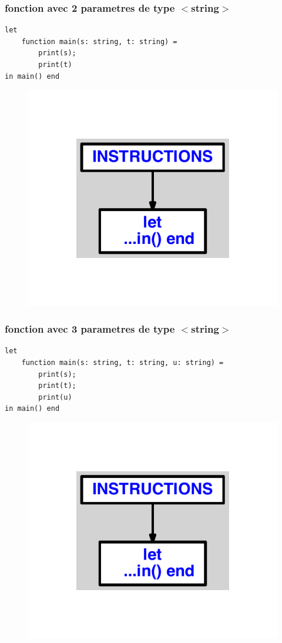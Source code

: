 \documentclass{article}
\begin{document}
\subsubsection{fonction avec 2 parametres de type $ < $string$ > $}
\begin{lstlisting}
let
	function main(s: string, t: string) =
		print(s);
		print(t)
in main() end
\end{lstlisting}
\newpage
\begin{figure}[H]
\centering
\includegraphics[max width=\textwidth]{ast/ast_241.pdf}
\end{figure}
\newpage
\subsubsection{fonction avec 3 parametres de type $ < $string$ > $}
\begin{lstlisting}
let
	function main(s: string, t: string, u: string) =
		print(s);
		print(t);
		print(u)
in main() end
\end{lstlisting}
\newpage
\begin{figure}[H]
\centering
\includegraphics[max width=\textwidth]{ast/ast_242.pdf}
\end{figure}
\newpage
\end{document}
